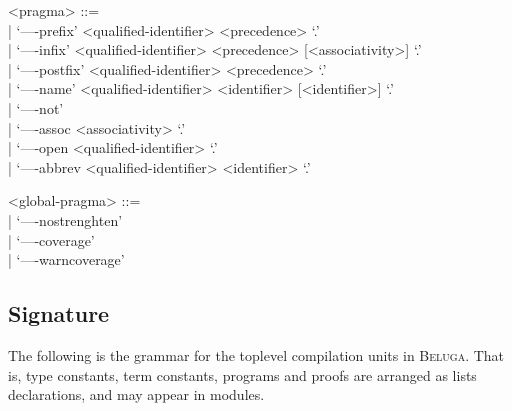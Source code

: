\documentclass[11pt]{article}
\newcommand{\Beluga}{\textsc{Beluga}\xspace}
\begin{document}
\begin{grammar}
<pragma> ::= \hfill\\
| `----prefix' <qualified-identifier> <precedence> `.'\\
| `----infix' <qualified-identifier> <precedence> [<associativity>] `.'\\
| `----postfix' <qualified-identifier> <precedence> `.'\\
| `----name' <qualified-identifier> <identifier> [<identifier>] `.'\\
| `----not'\\
| `----assoc <associativity> `.'\\
| `----open <qualified-identifier> `.'\\
| `----abbrev <qualified-identifier> <identifier> `.'

<global-pragma> ::= \hfill\\
| `----nostrenghten'\\
| `----coverage'\\
| `----warncoverage'
\end{grammar}

\subsection{Signature}\label{section:syntax-signature}

The following is the grammar for the toplevel compilation units in \Beluga.
That is, type constants, term constants, programs and proofs are arranged as lists declarations, and may appear in modules.
\end{document}
